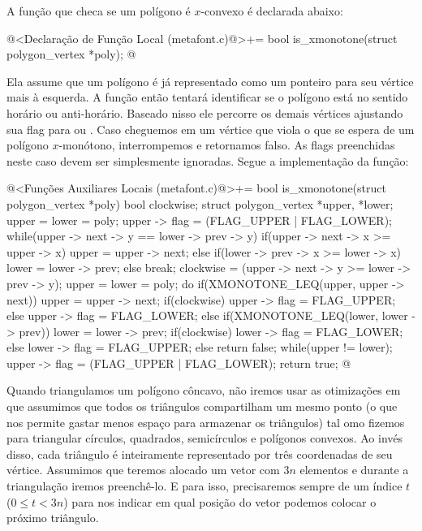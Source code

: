 {{{{{{A função que checa se um polígono é $x$-convexo é declarada abaixo:

\iniciocodigo
@<Declaração de Função Local (metafont.c)@>+=
bool is_xmonotone(struct polygon_vertex *poly);
@
\fimcodigo

Ela assume que um polígono é já representado como um ponteiro para seu
vértice mais à esquerda. A função então tentará identificar se o
polígono está no sentido horário ou anti-horário. Baseado nisso ele
percorre os demais vértices ajustando sua flag
para  ou . Caso cheguemos em
um vértice que viola o que se espera de um polígono $x$-monótono,
interrompemos e retornamos falso. As flags preenchidas neste caso
devem ser simplesmente ignoradas. Segue a implementação da função:

\iniciocodigo
@<Funções Auxiliares Locais (metafont.c)@>+=
bool is_xmonotone(struct polygon_vertex *poly){
  bool clockwise;
  struct polygon_vertex *upper, *lower;
  upper = lower = poly;
  upper -> flag = (FLAG_UPPER | FLAG_LOWER);
  while(upper -> next -> y == lower -> prev -> y){
    if(upper -> next -> x >= upper -> x)
      upper = upper -> next;
    else if(lower -> prev -> x >= lower -> x)
      lower = lower -> prev;
    else break;
  }
  clockwise = (upper -> next -> y >= lower -> prev -> y);
  upper = lower = poly;
  do{
    if(XMONOTONE_LEQ(upper, upper -> next)){
      upper = upper -> next;
      if(clockwise){
        upper -> flag = FLAG_UPPER;
      }
      else{
        upper -> flag = FLAG_LOWER;
      }
    }
    else if(XMONOTONE_LEQ(lower, lower -> prev)){
      lower = lower -> prev;
      if(clockwise){
        lower -> flag = FLAG_LOWER;
      }
      else{
        lower -> flag = FLAG_UPPER;
      }
    }
    else
      return false;
  } while(upper != lower);
  upper -> flag = (FLAG_UPPER | FLAG_LOWER);
  return true;
}
@

Quando triangulamos um polígono côncavo, não iremos usar as
otimizações em que assumimos que todos os triângulos compartilham um
mesmo ponto (o que nos permite gastar menos espaço para armazenar os
triângulos) tal omo fizemos para triangular círculos, quadrados,
semicírculos e polígonos convexos. Ao invés disso, cada triângulo é
inteiramente representado por três coordenadas de seu
vértice. Assumimos que teremos alocado um vetor com $3n$ elementos e
durante a triangulação iremos preenchê-lo. E para isso, precisaremos
sempre de um índice $t$ ($0\leq t<3n$) para nos indicar em qual
posição do vetor podemos colocar o próximo triângulo.

}}}}}}
